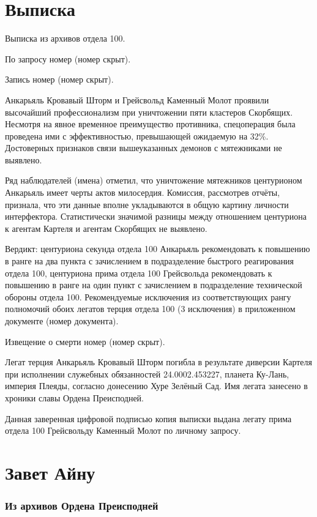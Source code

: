 \section{Выписка}

Выписка из архивов отдела 100.

По запросу номер (номер скрыт).

Запись номер (номер скрыт).

Анкарьяль Кровавый Шторм и Грейсвольд Каменный Молот проявили высочайший профессионализм при уничтожении пяти кластеров Скорбящих.
Несмотря на явное временное преимущество противника, спецоперация была проведена ими с эффективностью, превышающей ожидаемую на 32\%.
Достоверных признаков связи вышеуказанных демонов с мятежниками не выявлено.

Ряд наблюдателей (имена) отметил, что уничтожение мятежников центурионом Анкарьяль имеет черты актов милосердия.
Комиссия, рассмотрев отчёты, признала, что эти данные вполне укладываются в общую картину личности интерфектора.
Статистически значимой разницы между отношением центуриона к агентам Картеля и агентам Скорбящих не выявлено.

Вердикт: центуриона секунда отдела 100 Анкарьяль рекомендовать к повышению в ранге на два пункта с зачислением в подразделение быстрого реагирования отдела 100, центуриона прима отдела 100 Грейсвольда рекомендовать к повышению в ранге на один пункт с зачислением в подразделение технической обороны отдела 100.
Рекомендуемые исключения из соответствующих рангу полномочий обоих легатов терция отдела 100 (3 исключения) в приложенном документе (номер документа).

Извещение о смерти номер (номер скрыт).

Легат терция Анкарьяль Кровавый Шторм погибла в результате диверсии Картеля при исполнении служебных обязанностей 24.0002.453227, планета Ку-Лань, империя Плеяды, согласно донесению Хуре Зелёный Сад.
Имя легата занесено в хроники славы Ордена Преисподней.

Данная заверенная цифровой подписью копия выписки выдана легату прима отдела 100 Грейсвольду Каменный Молот по личному запросу.

\section{Завет Айну}

\subsubsection{Из архивов Ордена Преисподней}

